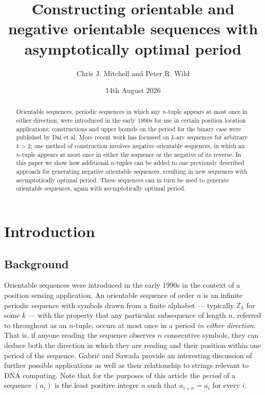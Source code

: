 \documentclass[a4paper,11pt]{article}
\title{Constructing orientable and negative orientable sequences with asymptotically optimal period}
\author{Chris J. Mitchell and Peter R. Wild}
\date{14th August 2026}
\theoremstyle{plain}
\theoremstyle{definition}
\theoremstyle{remark}
\begin{document}
\maketitle

\begin{abstract}
Orientable sequences, periodic sequences in which any $n$-tuple appears at most once in either
direction, were introduced in the early 1990s for use in certain position location applications;
constructions and upper bounds on the period for the binary case were published by Dai et al. More
recent work has focussed on $k$-ary sequences for arbitrary $k>2$; one method of construction
involves negative orientable sequences, in which an $n$-tuple appears at most once in either the
sequence or the negative of its reverse.  In this paper we show how additional $n$-tuples can be
added to one previously described approach for generating negative orientable sequences, resulting
in new sequences with asymptotically optimal period.  These sequences can in turn be used to
generate orientable sequences, again with asymptotically optimal period.

\end{abstract}

\section{Introduction} \label{section:introduction}

\subsection{Background}  \label{subsection:background}

Orientable sequences were introduced in the early 1990s \cite{Burns92,Burns93,Dai93} in the context
of a position sensing application.  An orientable sequence of order $n$ is an infinite periodic
sequence with symbols drawn from a finite alphabet --- typically $\mathbb{Z}_k$ for some $k$ ---
with the property that any particular subsequence of length $n$, referred to throughout as an
$n$-tuple, occurs at most once in a period \emph{in either direction}.  That is, if anyone reading
the sequence observes $n$ consecutive symbols, they can deduce both the direction in which they are
reading and their position within one period of the sequence. Gabri\'{c} and Sawada \cite{Gabric25}
provide an interesting discussion of further possible applications as well as their relationship to
strings relevant to DNA computing. Note that for the purposes of this article the
\emph{period} of a sequence $(a_i)$ is the least positive integer $n$ such that $a_{i+n}=a_i$ for
every $i$.
\end{document}
